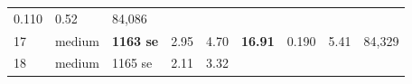 \documentclass[
  10pt, ]{article}
\begin{document}
\begin{longtable}[]{@{}lllllllll@{}}
\begin{minipage}[t]{0.08\columnwidth}
0.110\strut
\end{minipage} & \begin{minipage}[t]{0.08\columnwidth}\raggedright
0.52\strut
\end{minipage} & \begin{minipage}[t]{0.08\columnwidth}\raggedright
84,086\strut
\end{minipage}\tabularnewline
\begin{minipage}[t]{0.08\columnwidth}\raggedright
17\strut
\end{minipage} & \begin{minipage}[t]{0.08\columnwidth}\raggedright
medium\strut
\end{minipage} & \begin{minipage}[t]{0.08\columnwidth}\raggedright
\textbf{1163 se}\strut
\end{minipage} & \begin{minipage}[t]{0.08\columnwidth}\raggedright
2.95\strut
\end{minipage} & \begin{minipage}[t]{0.08\columnwidth}\raggedright
4.70\strut
\end{minipage} & \begin{minipage}[t]{0.08\columnwidth}\raggedright
\textbf{16.91}\strut
\end{minipage} & \begin{minipage}[t]{0.08\columnwidth}\raggedright
0.190\strut
\end{minipage} & \begin{minipage}[t]{0.08\columnwidth}\raggedright
5.41\strut
\end{minipage} & \begin{minipage}[t]{0.08\columnwidth}\raggedright
84,329\strut
\end{minipage}\tabularnewline
\begin{minipage}[t]{0.08\columnwidth}\raggedright
18\strut
\end{minipage} & \begin{minipage}[t]{0.08\columnwidth}\raggedright
medium\strut
\end{minipage} & \begin{minipage}[t]{0.08\columnwidth}\raggedright
1165 se\strut
\end{minipage} & \begin{minipage}[t]{0.08\columnwidth}\raggedright
2.11\strut
\end{minipage} & \begin{minipage}[t]{0.08\columnwidth}\raggedright
3.32\strut
\end{minipage} & \begin{minipage}[t]{0.08\columnwidth}\raggedright

\end{minipage}
\end{longtable}
\end{document}
